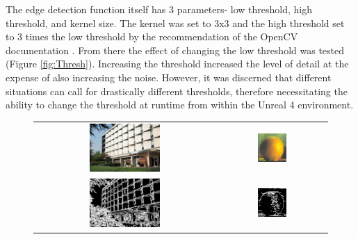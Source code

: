The edge detection function itself has 3 parameters- low threshold, high threshold, and kernel size. The kernel was set to 3x3 and the high threshold set to 3 times the low threshold by the recommendation of the OpenCV documentation \cite{cannyedgedetector}. From there the effect of changing the low threshold was tested (Figure \ref{fig:Thresh}). Increasing the threshold increased the level of detail at the expense of also increasing the noise. However, it was discerned that different situations can call for drastically different thresholds, therefore necessitating the ability to change the threshold at runtime from within the Unreal 4 environment.

\begin{figure}[H]
    \begin{center}
    \begin{tabular}{ c c }
        \includegraphics[width=0.405\textwidth]{Figures/building.jpg} &
        \includegraphics[width=0.28\textwidth]{Figures/orange.jpg} \\
        \includegraphics[width=0.405\textwidth]{Figures/buildThresh15.jpg} &
        \includegraphics[width=0.28\textwidth]{Figures/orangeThresh15.jpg} \\

\end{tabular}
\end{center}
\end{figure}

